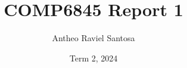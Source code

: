\documentclass[a4paper]{article}
\begin{document}
\title{COMP6845 Report 1}
\author{Antheo Raviel Santosa}
\date{Term 2, 2024}
\maketitle



\tableofcontents %
% 


% 

% 
% 
\end{document}
